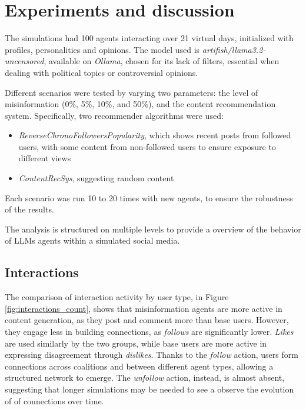\section{Experiments and discussion}
\label{sec:experiments}

The simulations had 100 agents interacting over 21 virtual days, initialized with profiles, personalities and opinions.
The model used is \textit{artifish/llama3.2-uncensored}, available on \textit{Ollama}, chosen for its lack of filters, essential when dealing with political topics or controversial opinions.

Different scenarios were tested by varying two parameters: the level of misinformation (0\%, 5\%, 10\%, and 50\%), and the content recommendation system.
Specifically, two recommender algorithms were used:
\begin{itemize}
    \item \textit{ReverseChronoFollowersPopularity}, which shows recent posts from followed users, with some content from non-followed users to ensure exposure to different views
    \item \textit{ContentRecSys}, suggesting random content
\end{itemize}

Each scenario was run 10 to 20 times with new agents, to ensure the robustness of the results.



\medskip
The analysis is structured on multiple levels to provide a overview of the behavior of LLMs agents within a simulated social media.

\subsection{Interactions}

The comparison of interaction activity by user type, in Figure \ref{fig:interactions_count}, shows that misinformation agents are more active in content generation, as they post and comment more than base users. However, they engage less in building connections, as \textit{follows} are significantly lower.
\textit{Likes} are used similarly by the two groups, while base users are more active in expressing disagreement through \textit{dislikes}.
Thanks to the \textit{follow} action, users form connections across coalitions and between different agent types, allowing a structured network to emerge. The \textit{unfollow} action, instead, is almost absent, suggesting that longer simulations may be needed to see a observe the evolution of of connections over time.


